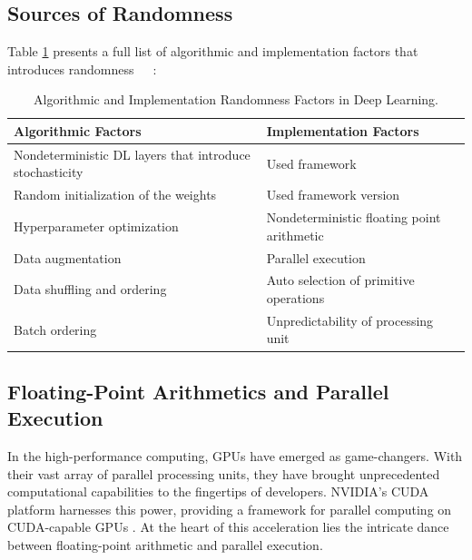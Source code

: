\subsection{Sources of Randomness}
Table \ref{tab:randomness_factors} presents a full list of algorithmic and implementation factors that introduces randomness~\cite{pham2020problems}~\cite{gundersen2022sources}~\cite{zhuang2022randomness}:

\begin{table}[h]
    \centering
    \renewcommand{\arraystretch}{1.5} %
    \setlength\tabcolsep{10pt} %
    \begin{tabular}{|m{}|m{}|}
    \hline
    \rowcolor{lightgray}
    \textbf{Algorithmic Factors} & \textbf{Implementation Factors} \\
    \hline
    Nondeterministic DL layers that introduce stochasticity & Used framework \\
    \hline
    Random initialization of the weights & Used framework version \\
    \hline
    Hyperparameter optimization & Nondeterministic floating point arithmetic \\
    \hline
    Data augmentation & Parallel execution \\
    \hline
    Data shuffling and ordering & Auto selection of primitive operations \\
    \hline
    Batch ordering & Unpredictability of processing unit \\
    \hline
    \end{tabular}
    \caption{Algorithmic and Implementation Randomness Factors in Deep Learning.}
    \label{tab:randomness_factors}
\end{table}

\subsection{Floating-Point Arithmetics and Parallel Execution}

In the high-performance computing, GPUs have emerged as game-changers. With their vast array of parallel processing units, they have brought unprecedented computational capabilities to the fingertips of developers. NVIDIA's CUDA platform harnesses this power, providing a framework for parallel computing on CUDA-capable GPUs \cite{chetlur2014cudnn}. At the heart of this acceleration lies the intricate dance between floating-point arithmetic and parallel execution.\\

